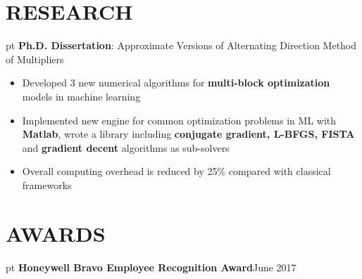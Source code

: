 \documentclass[10.5pt]{res} %
\begin{document}
\begin{resume}
\section{RESEARCH}  pt
	\textbf{Ph.D. Dissertation}: Approximate Versions of Alternating Direction Method of Multipliers
	\begin{itemize} pt
		\item Developed 3 new %
		 numerical algorithms for \textbf{multi-block optimization} models in machine learning  %
		\item Implemented new engine for common optimization problems in ML with \textbf{Matlab}, wrote a library including \textbf{conjugate gradient, L-BFGS, FISTA} and \textbf{gradient decent} algorithms as sub-solvers
		\item Overall computing overhead is reduced by 25\% compared with classical frameworks
	\end{itemize}
%
\section{AWARDS}  pt
\textbf{Honeywell Bravo Employee Recognition Award}\hfill June 2017
%

\end{resume}
\end{document}
